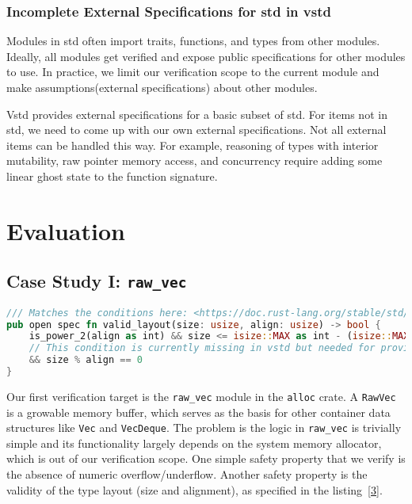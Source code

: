 \documentclass[conference]{IEEEtran}
\begin{document}
\subsubsection{Incomplete External Specifications for std in vstd}
Modules in std often import traits, functions, and types from other modules. Ideally, all modules get verified and expose public specifications for other modules to use. In practice, we limit our verification scope to the current module and make assumptions(external specifications) about other modules. 

Vstd provides external specifications for a basic subset of std. For items not in std, we need to come up with our own external specifications. Not all external items can be handled this way. For example, reasoning of types with interior mutability, raw pointer memory access, and concurrency require adding some linear ghost state to the function signature.  

\section{Evaluation}
\subsection{Case Study I: \texttt{raw\_vec}}
\begin{lstlisting}[language=Rust,style=colouredRust, caption={The formal specification of a valid layout in vstd}, label = {3}]
/// Matches the conditions here: <https://doc.rust-lang.org/stable/std/alloc/struct.Layout.html>
pub open spec fn valid_layout(size: usize, align: usize) -> bool {
    is_power_2(align as int) && size <= isize::MAX as int - (isize::MAX as int % align as int)
    // This condition is currently missing in vstd but needed for proving pointer arithmics. See <https://github.com/verus-lang/verus/issues/1570>.
    && size % align == 0 
}
\end{lstlisting}
Our first verification target is the \texttt{raw\_vec} module in the \texttt{alloc} crate. A \texttt{RawVec} is a growable memory buffer, which serves as the basis for other container data structures like \texttt{Vec} and \texttt{VecDeque}. The problem is the logic in \texttt{raw\_vec} is trivially simple and its functionality largely depends on the system memory allocator, which is out of our verification scope. One simple safety property that we verify is the absence of numeric overflow/underflow. Another safety property is the validity of the type layout (size and alignment), as specified in the listing~\ref{3}. 
\end{document}
